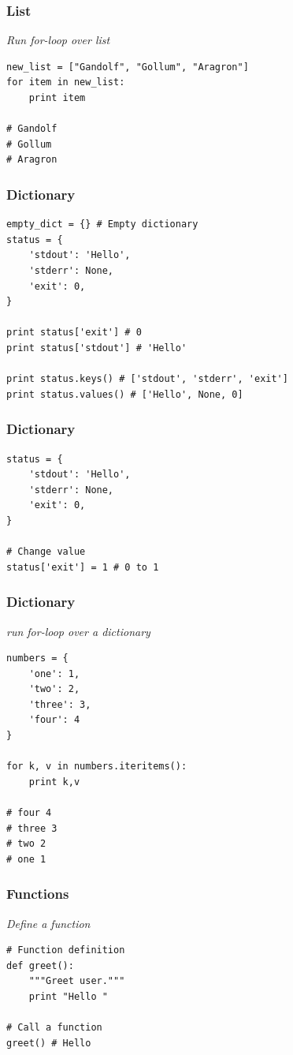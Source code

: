 \documentclass[bigger, presentation]{beamer}
\begin{document}
\begin{frame}[fragile]
\frametitle{List}
\label{sec-2-6}

   \emph{Run for-loop over list}


\begin{verbatim}
new_list = ["Gandolf", "Gollum", "Aragron"]
for item in new_list:
    print item

# Gandolf
# Gollum
# Aragron
\end{verbatim}
\end{frame}
\begin{frame}[fragile]
\frametitle{Dictionary}
\label{sec-2-7}



\begin{verbatim}
empty_dict = {} # Empty dictionary
status = {
    'stdout': 'Hello',
    'stderr': None,
    'exit': 0,
}

print status['exit'] # 0
print status['stdout'] # 'Hello'

print status.keys() # ['stdout', 'stderr', 'exit']
print status.values() # ['Hello', None, 0]
\end{verbatim}
\end{frame}
\begin{frame}[fragile]
\frametitle{Dictionary}
\label{sec-2-8}



\begin{verbatim}
status = {
    'stdout': 'Hello',
    'stderr': None,
    'exit': 0,
}

# Change value
status['exit'] = 1 # 0 to 1
\end{verbatim}
\end{frame}
\begin{frame}[fragile]
\frametitle{Dictionary}
\label{sec-2-9}

   \emph{run for-loop over a dictionary}

\begin{verbatim}
numbers = {
    'one': 1,
    'two': 2,
    'three': 3,
    'four': 4
}

for k, v in numbers.iteritems():
    print k,v

# four 4
# three 3
# two 2
# one 1
\end{verbatim}
\end{frame}
\begin{frame}[fragile]
\frametitle{Functions}
\label{sec-2-10}

   \emph{Define a function}


\begin{verbatim}
# Function definition
def greet():
    """Greet user."""
    print "Hello "

# Call a function
greet() # Hello
\end{verbatim}
\end{frame}
\end{document}
